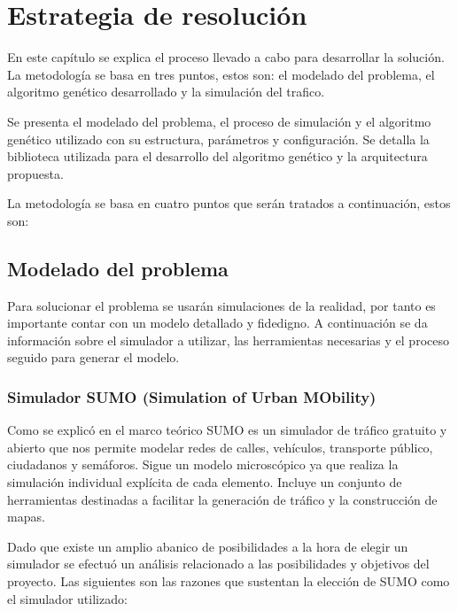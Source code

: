 \chapter{Estrategia de resolución}

En este capítulo se explica el proceso llevado a cabo para desarrollar la solución. La metodología se basa en tres puntos, estos son: el modelado del problema, el algoritmo genético desarrollado y la simulación del trafico.

Se presenta el modelado del problema, el proceso de simulación y el algoritmo genético utilizado con su estructura, parámetros y configuración. Se detalla la biblioteca utilizada para el desarrollo del algoritmo genético y la arquitectura propuesta.

La metodología se basa en cuatro puntos que serán tratados a continuación, estos son:


\section{Modelado del problema }

Para solucionar el problema se usarán simulaciones de la realidad, por tanto es importante contar con un modelo detallado y fidedigno. A continuación se da información sobre el simulador a utilizar, las herramientas necesarias y el proceso seguido para generar el modelo. 

\subsection{Simulador SUMO (Simulation of Urban MObility)}

Como se explicó en el marco teórico SUMO es un simulador de tráfico gratuito y abierto que nos permite modelar redes de calles, vehículos, transporte público, ciudadanos y semáforos. Sigue un modelo microscópico ya que realiza la simulación individual explícita de cada elemento. Incluye un conjunto de herramientas destinadas  a facilitar la generación de tráfico y la construcción de mapas. 

Dado que existe un amplio abanico de posibilidades a la hora de elegir un simulador se efectuó un análisis relacionado a las posibilidades y objetivos del proyecto. Las siguientes son las razones que sustentan la elección de SUMO como el simulador utilizado:

